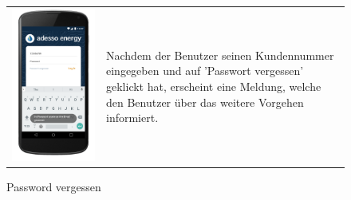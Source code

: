 \begin{figure}[h]
\begin{tabularx}{\textwidth}{X  X}
	\includegraphics[scale = 0.155]{img/AndroidMockup/forgotPassword} \caption{Password vergessen} & Nachdem der Benutzer seinen Kundennummer eingegeben und auf 'Passwort vergessen' geklickt hat, erscheint eine Meldung, welche den Benutzer über das weitere Vorgehen informiert.\\

\end{tabularx}
\end{figure}
